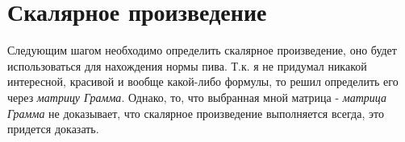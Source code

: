 \section*{Скалярное произведение}
Следующим шагом необходимо определить скалярное произведение, оно будет использоваться для нахождения нормы пива.
Т.к. я не придумал никакой интересной, красивой и вообще какой-либо формулы, то решил определить его через \textit{матрицу Грамма}. Однако, то, что выбранная мной матрица - \textit{матрица Грамма} не доказывает, что скалярное произведение выполняется всегда, это придется доказать.

